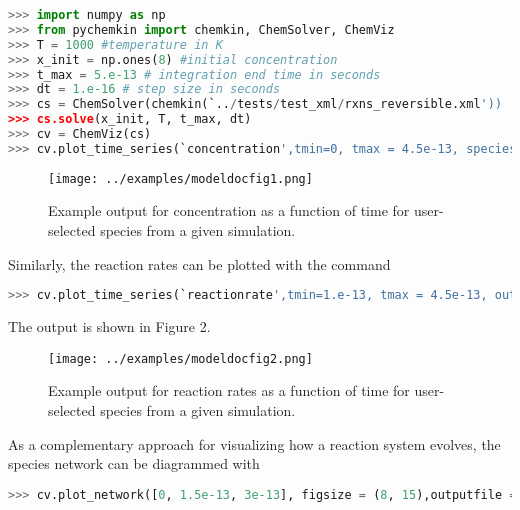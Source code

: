 \documentclass[12pt]{article}
\begin{document}
\begin{lstlisting}[language = Python, basicstyle = \ttfamily,columns = fullflexible, showstringspaces = False]
>>> import numpy as np
>>> from pychemkin import chemkin, ChemSolver, ChemViz
>>> T = 1000 #temperature in K
>>> x_init = np.ones(8) #initial concentration
>>> t_max = 5.e-13 # integration end time in seconds
>>> dt = 1.e-16 # step size in seconds
>>> cs = ChemSolver(chemkin(`../tests/test_xml/rxns_reversible.xml'))
>>> cs.solve(x_init, T, t_max, dt)
>>> cv = ChemViz(cs)
>>> cv.plot_time_series(`concentration',tmin=0, tmax = 4.5e-13, species = [`H', `OH', `O2', `H2O'],outputfile = `modeldocfig1.png')
\end{lstlisting}

\begin{figure}[h!]
  \caption{Example output for concentration as a function of time for user-selected species from a given simulation.}
  \centering
  \texttt{[image: ../examples/modeldocfig1.png]}
\end{figure}

Similarly, the reaction rates can be plotted with the command \\

\begin{lstlisting}[language = Python, basicstyle = \ttfamily,columns = fullflexible, showstringspaces = False]
>>> cv.plot_time_series(`reactionrate',tmin=1.e-13, tmax = 4.5e-13, outputfile = `modeldocfig2.png')
\end{lstlisting}
The output is shown in Figure 2. 




\begin{figure}[h!]
  \caption{Example output for reaction rates as a function of time for user-selected species from a given simulation.}
  \centering
  \texttt{[image: ../examples/modeldocfig2.png]}
\end{figure}

As a complementary approach for visualizing how a reaction system evolves, the species network can be diagrammed with 
\begin{lstlisting}[language = Python, basicstyle = \ttfamily,columns = fullflexible, showstringspaces = False]
>>> cv.plot_network([0, 1.5e-13, 3e-13], figsize = (8, 15),outputfile = `modeldocfig3.png')

\end{lstlisting}
\end{document}
